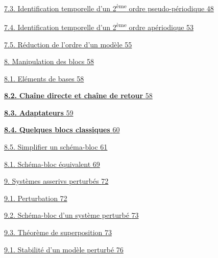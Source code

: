 \protect\hyperlink{identification-temporelle-dun-2uxe8me-ordre-pseudo-puxe9riodique}{7.3. Identification temporelle d'un 2\textsuperscript{ème} ordre pseudo-périodique \protect\hyperlink{identification-temporelle-dun-2uxe8me-ordre-pseudo-puxe9riodique}{48}}

\protect\hyperlink{identification-temporelle-dun-2uxe8me-ordre-apuxe9riodique}{7.4. Identification temporelle d'un 2\textsuperscript{ème} ordre apériodique \protect\hyperlink{identification-temporelle-dun-2uxe8me-ordre-apuxe9riodique}{53}}

\protect\hyperlink{_Toc149497255}{7.5. Réduction de l'ordre d'un modèle \protect\hyperlink{_Toc149497255}{55}}

\protect\hyperlink{manipulation-des-blocs}{8. Manipulation des blocs \protect\hyperlink{manipulation-des-blocs}{58}}

\protect\hyperlink{eluxe9ments-de-bases}{8.1. Eléments de bases \protect\hyperlink{eluxe9ments-de-bases}{58}}

\protect\hyperlink{_Toc99121080}{\textbf{8.2.} \textbf{Chaîne directe et chaîne de retour} \protect\hyperlink{_Toc99121080}{58}}

\protect\hyperlink{_Toc149497259}{\textbf{8.3.} \textbf{Adaptateurs} \protect\hyperlink{_Toc149497259}{59}}

\protect\hyperlink{_Toc149497260}{\textbf{8.4.} \textbf{Quelques blocs classiques} \protect\hyperlink{_Toc149497260}{60}}

\protect\hyperlink{simplifier-un-schuxe9ma-bloc}{8.5. Simplifier un schéma-bloc \protect\hyperlink{simplifier-un-schuxe9ma-bloc}{61}}

\protect\hyperlink{schuxe9ma-bloc-uxe9quivalent}{8.1. Schéma-bloc équivalent \protect\hyperlink{schuxe9ma-bloc-uxe9quivalent}{69}}

\protect\hyperlink{systuxe8mes-asserivs-perturbuxe9s}{9. Systèmes asserivs perturbés \protect\hyperlink{systuxe8mes-asserivs-perturbuxe9s}{72}}

\protect\hyperlink{perturbation}{9.1. Perturbation \protect\hyperlink{perturbation}{72}}

\protect\hyperlink{schuxe9ma-bloc-dun-systuxe8me-perturbuxe9}{9.2. Schéma-bloc d'un système perturbé \protect\hyperlink{schuxe9ma-bloc-dun-systuxe8me-perturbuxe9}{73}}

\protect\hyperlink{thuxe9oruxe8me-de-superposition}{9.3. Théorème de superposition \protect\hyperlink{thuxe9oruxe8me-de-superposition}{73}}

\protect\hyperlink{stabilituxe9-dun-moduxe8le-perturbuxe9}{9.1. Stabilité d'un modèle perturbé \protect\hyperlink{stabilituxe9-dun-moduxe8le-perturbuxe9}{76}}

